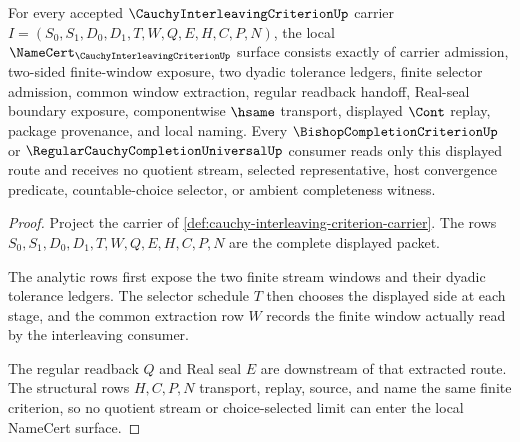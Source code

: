 \begin{theorem}
\label{thm:cauchy-interleaving-criterion-namecert-obligations}
For every accepted $\CauchyInterleavingCriterionUp$ carrier $I=(S_0,S_1,D_0,D_1,T,W,Q,E,H,C,P,N)$, the local $\NameCert_{\CauchyInterleavingCriterionUp}$ surface consists exactly of carrier admission, two-sided finite-window exposure, two dyadic tolerance ledgers, finite selector admission, common window extraction, regular readback handoff, Real-seal boundary exposure, componentwise $\hsame$ transport, displayed $\Cont$ replay, package provenance, and local naming. Every $\BishopCompletionCriterionUp$ or $\RegularCauchyCompletionUniversalUp$ consumer reads only this displayed route and receives no quotient stream, selected representative, host convergence predicate, countable-choice selector, or ambient completeness witness.
\end{theorem}
\begin{proof}
Project the carrier of \autoref{def:cauchy-interleaving-criterion-carrier}. The rows $S_0,S_1,D_0,D_1,T,W,Q,E,H,C,P,N$ are the complete displayed packet.

The analytic rows first expose the two finite stream windows and their dyadic tolerance ledgers. The selector schedule $T$ then chooses the displayed side at each stage, and the common extraction row $W$ records the finite window actually read by the interleaving consumer.

The regular readback $Q$ and Real seal $E$ are downstream of that extracted route. The structural rows $H,C,P,N$ transport, replay, source, and name the same finite criterion, so no quotient stream or choice-selected limit can enter the local NameCert surface.
\end{proof}

